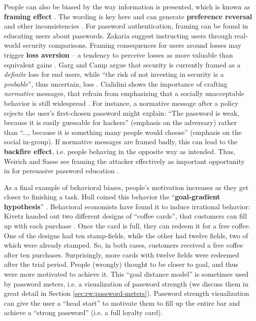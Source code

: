 	People can also be biased by the way information is presented, which is known as \textbf{framing effect} \cite{Verendel2008ProspectTheorySecurity}. The wording is key here and can generate \textbf{preference reversal} and other inconsistencies \cite{Huber1982AsymetricallyDominated}.  For password authentication, framing can be found in educating users about passwords. Zakaria \etal \cite{Zakaria2013DesigningEffectiveSecurityMessages} suggest instructing users through real-world security comparisons. Framing consequences for users around losses may trigger \textbf{loss aversion} -- a tendency to perceive losses as more valuable than equivalent gains \cite{Ariely2005LossesGains}. Garg and Camp argue that security is currently framed as a \textit{definite} loss for end users, while ``the risk of not investing in security is a \textit{probable}'', thus uncertain, loss \cite{Garg2013HeuristicsAndBiases}. Cialidini shows the importance of crafting \textit{normative} messages, that refrain from emphasizing that a socially unacceptable behavior is still widespread \cite{Cialdini2003CraftingNormativeMessages}. For instance, a normative message after a policy rejects the user's first-chosen password might explain: ``The password is weak, because it is easily guessable for hackers'' (emphasis on the adversary) rather than ``..., because it is something many people would choose'' (emphasis on the social in-group). If normative messages are framed badly, this can lead to the \textbf{backfire effect}, i.e. people behaving in the opposite way as intended. Thus, Weirich and Sasse see framing the attacker effectively as important opportunity in for persuasive password education \cite{Weirich2001PrettyGoodPersuasion,Weirich2005PersuasivePasswordSecurity}.
	
	As a final example of behavioral biases, people's motivation increases as they get closer to finishing a task. Hull coined this behavior the ``\textbf{goal-gradient hypothesis}'' \cite{Kivetz2006GoalGradient}. Behavioral economists have found it to induce irrational behavior: Kivetz \etal handed out two different designs of ``coffee cards'', that customers can fill up with each purchase \cite{Kivetz2006GoalGradient}. Once the card is full, they can redeem it for a free coffee. One of the designs had ten stamp-fields, while the other had twelve fields, two of which were already stamped. So, in both cases, customers received a free coffee after ten purchases. Surprisingly, more cards with twelve fields were redeemed after the trial period. People (wrongly) thought to be closer to goal, and thus were more motivated to achieve it. This ``goal distance model'' is sometimes used by password meters, i.e. a visualization of password strength (we discuss them in great detail in Section \ref{sec:rw:password-meters}). Password strength visualization can give the user a ``head start'' to motivate them to fill up the entire bar and achieve a ``strong password'' (i.e. a full loyalty card). 
	
